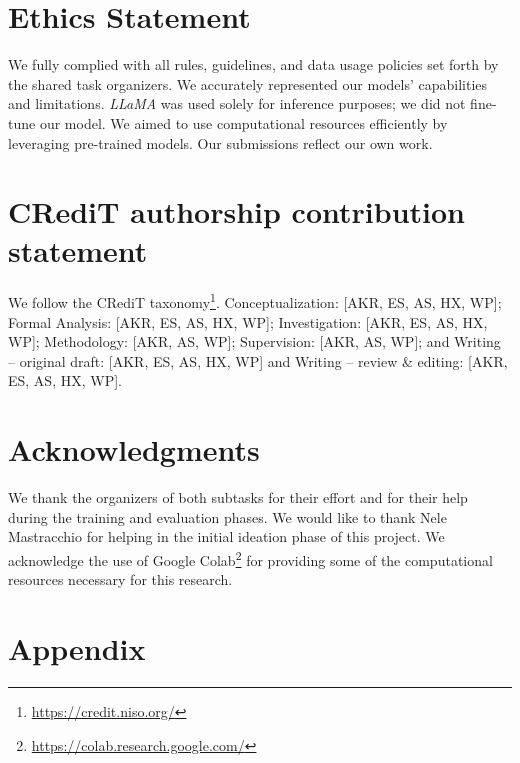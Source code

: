\documentclass[11pt]{article}
\begin{document}
\section*{Ethics Statement}


We fully complied with all rules, guidelines, and data usage policies set forth by the shared task organizers. We accurately represented our models' capabilities and limitations. \textit{LLaMA} was used solely for inference purposes; we did not fine-tune our model. We aimed to use computational resources efficiently by leveraging pre-trained models. Our submissions reflect our own work. 

\section*{CRediT authorship contribution statement}

We follow the CRediT taxonomy\footnote{ \url{https://credit.niso.org/}}. Conceptualization: [AKR, ES, AS, HX, WP];  Formal Analysis: [AKR, ES, AS, HX, WP]; Investigation: [AKR, ES, AS, HX, WP]; Methodology: [AKR, AS, WP]; Supervision: [AKR, AS, WP]; and Writing – original draft: [AKR, ES, AS, HX, WP] and Writing – review \& editing: [AKR, ES, AS, HX, WP].


\section*{Acknowledgments}
We thank the organizers of both subtasks for their effort and for their help during the training and evaluation phases. We would like to thank Nele Mastracchio for helping in the initial ideation phase of this project. We acknowledge the use of Google Colab\footnote{\url{https://colab.research.google.com/}} for providing some of the computational resources necessary for this research. 
%


\appendix
\section*{Appendix}
\end{document}
